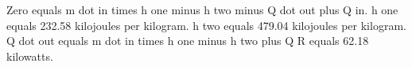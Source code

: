 Zero equals m dot in times h one minus h two minus Q dot out plus Q in. h one equals 232.58 kilojoules per kilogram. h two equals 479.04 kilojoules per kilogram. Q dot out equals m dot in times h one minus h two plus Q R equals 62.18 kilowatts.